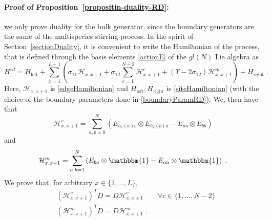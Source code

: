 \documentclass[10pt]{article}
\numberwithin{equation}{section}
\numberwithin{equation}{subsection}
\newcommand{\dt}{\;.}
\begin{document}

\paragraph{Proof of Proposition~\ref{propositin-duality-RD}:}
we only prove duality for the bulk generator, since the boundary generators are the same of the multispecies stirring process. In the spirit of Section~\ref{sectionDuality}, it is convenient to write the Hamiltonian of the process, that is defined through the basis elements \eqref{actionE} of the ${gl}(N)$ Lie algebra as 
\begin{equation}
	H^{rd}=H_{\text{left}}+\sum_{x=1}^{L-1}\left(\sigma_{11}\mathcal{H}_{x,x+1}+\sigma_{12}\sum_{c=1}^{N-2}\mathcal{H}_{x,x+1}^{c}+(\Upsilon-2\sigma_{12})\mathcal{H}_{x,x+1}^{m}\right)+H_{\text{right}}\dt
\end{equation}
Here, $\mathcal{H}_{x,x+1}$ is  \eqref{edgeHamiltonian}  and $H_{\text{left}},H_{\text{right}}$ is \eqref{siteHamiltonian} (with the choice of the boundary parameters done in \eqref{boundaryParamRD}). We, then have that 
\begin{equation}
	\mathcal{H}_{x,x+1}^{c}=\sum_{a,b=0}^{N}\left(E_{h_{c}(a)b}\otimes E_{h_{c}(b)a}-E_{aa}\otimes E_{bb}\right)
\end{equation}
and 
\begin{equation}
	\mathcal{H}_{x,x+1}^{m}=\sum_{a,b=1}^{N}\left(E_{ba}\otimes \mathbbm{1}-E_{aa}\otimes \mathbbm{1}\right)\dt
\end{equation}
We prove that, for arbitrary $x\in\{1,\ldots,L\}$,
\begin{align}
	&(\mathcal{H}_{x,x+1}^{c})^{T}D=D\mathcal{H}_{x,x+1}^{c}\qquad \forall c\in \{1,\ldots,N-2\}\label{cDualityRelation}\\
	&(\mathcal{H}_{x,x+1}^{m})^{T}D=D\mathcal{H}_{x,x+1}^{m}\label{mDualityRelation}\dt
\end{align}
\end{document}
